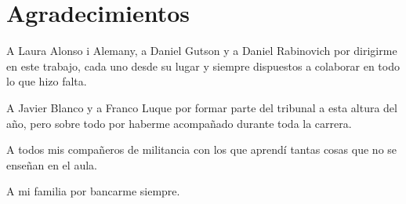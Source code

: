 \chapter*{Agradecimientos}
A Laura Alonso i Alemany, a Daniel Gutson y a Daniel Rabinovich por dirigirme en
este trabajo, cada uno desde su lugar y siempre dispuestos a colaborar en todo
lo que hizo falta. 

A Javier Blanco y a Franco Luque por formar parte del tribunal a esta altura del
a\~no, pero sobre todo por haberme acompa\~nado durante toda la carrera. 

A todos mis compa\~neros de militancia con los que aprend\'i tantas cosas que no
se ense\~nan en el aula. 

A mi familia por bancarme siempre.